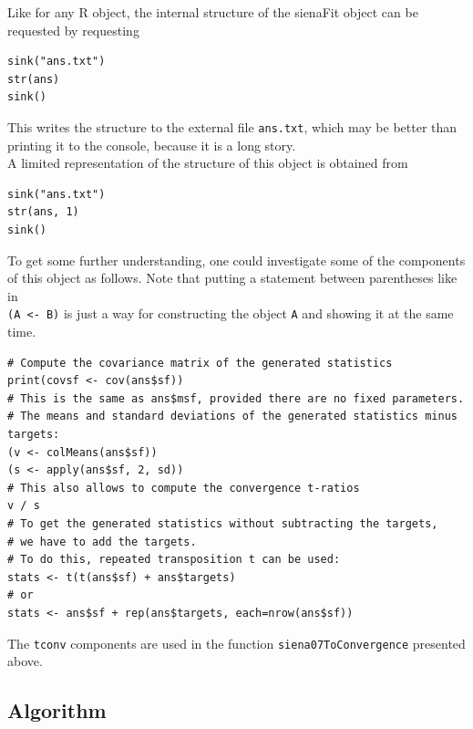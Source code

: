 \documentclass[a4paper,fleqn,11pt]{article}
\newcommand{\+}{\, + \,}
\newcommand{\R}{{\sf R }}
\begin{document}
Like for any \R object, the internal structure of the \textsf{sienaFit} object
can be requested by requesting
\begin{verbatim}
sink("ans.txt")
str(ans)
sink()
\end{verbatim}
This writes the structure to the external file \texttt{ans.txt}, which may
be better than printing it to the console, because it is a long story.\\
A limited representation of the structure of this object is obtained from
\begin{verbatim}
sink("ans.txt")
str(ans, 1)
sink()
\end{verbatim}

To get some further understanding, one could investigate some of the components
of this object as follows.
Note that putting a statement between parentheses like in\\
\texttt{(A <- B)} is just a way for
constructing the object \texttt{A} and showing it at the same time.
\begin{verbatim}
# Compute the covariance matrix of the generated statistics
print(covsf <- cov(ans$sf))
# This is the same as ans$msf, provided there are no fixed parameters.
# The means and standard deviations of the generated statistics minus targets:
(v <- colMeans(ans$sf))
(s <- apply(ans$sf, 2, sd))
# This also allows to compute the convergence t-ratios
v / s
# To get the generated statistics without subtracting the targets,
# we have to add the targets.
# To do this, repeated transposition t can be used:
stats <- t(t(ans$sf) + ans$targets)
# or
stats <- ans$sf + rep(ans$targets, each=nrow(ans$sf))
\end{verbatim}

The \texttt{tconv} components are used
in the function \texttt{siena07ToConvergence}
presented above.

\subsection{Algorithm}
\label{S_algorithm}
\end{document}
